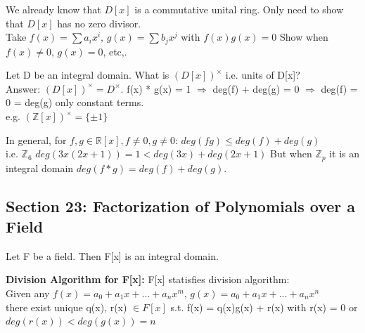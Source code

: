 \documentclass{article}
\newcommand\R{\ensuremath{\mathbb{R}}}
\newcommand\Z{\ensuremath{\mathbb{Z}}}
\begin{document}
\begin{Proof}
    We already know that $D[x]$ is a commutative unital ring. Only need to show that $D[x]$ has no zero divisor. 
    \\Take $f(x) = \sum a_ix^i$, $g(x) = \sum b_jx^j$ with $f(x) g(x) = 0$
    Show when $f(x) \neq 0$, $g(x) = 0$, etc,.
\end{Proof}
\begin{Example}
    Let D be an integral domain. What is $(D[x])^\times $ i.e. units of D[x]? 
    \\Answer: $(D[x])^\times = D^\times$. f(x) * g(x) = 1 $\Rightarrow$ deg(f) + deg(g) = 0 $\Rightarrow$ deg(f) = 0 = deg(g) only constant terms. 
    \\e.g. $(\Z[x])^\times = \{\pm 1\}$
\end{Example}
\begin{note}
    In general, for $f,g \in \R[x], f\neq 0, g\neq 0$: $deg(fg) \leq deg(f) + deg(g)$
    \\ i.e. $\Z_6 $ $deg(3x(2x+1)) = 1 < deg(3x) + deg(2x+1)$ But when $\Z_p$ it is an integral domain  $deg(f*g) = deg(f) + deg(g)$.
\end{note}
\newpage





\subsection{Section 23: Factorization of Polynomials over a Field}
Let F be a field. Then F[x] is an integral domain.
\begin{theorem}
\textbf{Division Algorithm for F[x]:}
    F[x] statisfies division algorithm:
    \\ Given any $f(x) = a_0 + a_1 x +...+ a_nx^m$,  
    $g(x) = a_0 + a_1 x +...+ a_nx^n$
    \\ there exist unique q(x), r(x) $\in F[x]$ s.t. f(x) = q(x)g(x) + r(x) with r(x) = 0 or $deg(r(x)) < deg(g(x)) = n$
\end{theorem}
\end{document}
